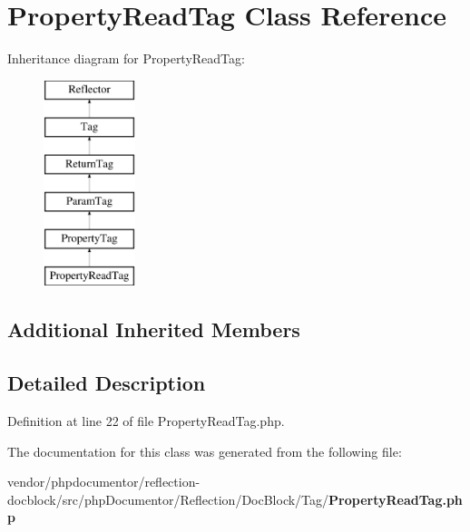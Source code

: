 \section{Property\+Read\+Tag Class Reference}
\label{classphp_documentor_1_1_reflection_1_1_doc_block_1_1_tag_1_1_property_read_tag}
Inheritance diagram for Property\+Read\+Tag\+:\begin{figure}[H]
\begin{center}
\leavevmode
\includegraphics[height=6.000000cm]{classphp_documentor_1_1_reflection_1_1_doc_block_1_1_tag_1_1_property_read_tag}
\end{center}
\end{figure}
\subsection*{Additional Inherited Members}


\subsection{Detailed Description}


Definition at line 22 of file Property\+Read\+Tag.\+php.



The documentation for this class was generated from the following file\+:\begin{DoxyCompactItemize}
\item 
vendor/phpdocumentor/reflection-\/docblock/src/php\+Documentor/\+Reflection/\+Doc\+Block/\+Tag/{\bf Property\+Read\+Tag.\+php}\end{DoxyCompactItemize}
